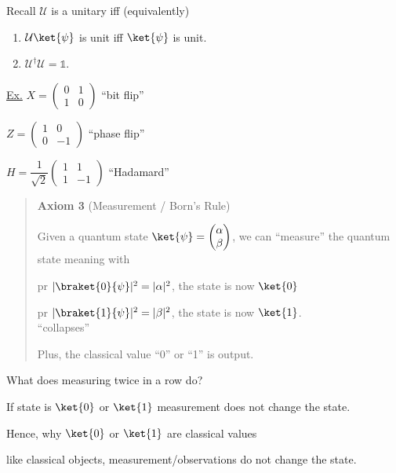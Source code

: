 \documentclass[11pt]{article}
\begin{document}
Recall $\mathcal{U}$ is a unitary iff (equivalently)
\begin{enumerate}
    \item[\textcircled{1}] $\mathcal{U}\ket{\psi}$ is unit iff $\ket{\psi}$ is unit.
    \item[\textcircled{2}] $\mathcal{U}^\dagger \mathcal{U} = \mathbb{1}$.
\end{enumerate}

\underline{Ex.} $X = \begin{pmatrix} 0 & 1 \\ 1 & 0 \end{pmatrix}$ \quad ``bit flip''

$Z = \begin{pmatrix} 1 & 0 \\ 0 & -1 \end{pmatrix}$ \quad ``phase flip''

$H = \dfrac{1}{\sqrt 2}\begin{pmatrix} 1 & 1 \\ 1 & -1 \end{pmatrix}$ \quad ``Hadamard''

\begin{quote}
\textbf{Axiom 3} (Measurement / Born's Rule)

Given a quantum state $\ket{\psi} = \begin{pmatrix}\alpha\\\beta\end{pmatrix}$, we can ``measure'' the quantum state meaning with

pr $|\braket{0}{\psi}|^2 = |\alpha|^2$, the state is now $\ket{0}$

pr $|\braket{1}{\psi}|^2 = |\beta|^2$, the state is now $\ket{1}$. \underline{\hspace{2cm}}\\
\hspace*{5cm}``collapses''

Plus, the classical value ``0'' or ``1'' is output.
\end{quote}

What does measuring twice in a row do?

If state is $\ket{0}$ or $\ket{1}$ measurement does not change the state.

Hence, why $\ket{0}$ or $\ket{1}$ are classical values

like classical objects, measurement/observations do not change the state.

\begin{figure}[h]
\centering
{}
\end{figure}
\end{document}
